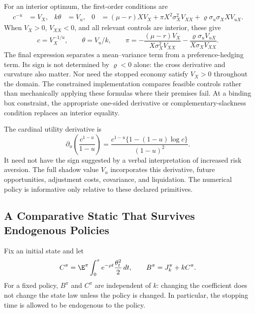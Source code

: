 For an interior optimum, the first-order conditions are
\begin{align}
 c^{-u}&=V_X,& k\theta&=V_u,&
 0&=(\mu-r)XV_X+\pi X^2\sigma_X^2V_{XX}
               +\varrho\sigma_u\sigma_X X V_{uX}.
 \label{eq:ndu_FOC}
\end{align}
When $V_X>0$, $V_{XX}<0$, and all relevant controls are interior, these give
\begin{equation}
 c=V_X^{-1/u},\qquad \theta=V_u/k,\qquad
 \pi=-\frac{(\mu-r)V_X}{X\sigma_X^2V_{XX}}
      -\frac{\varrho\sigma_uV_{uX}}{X\sigma_XV_{XX}}.
 \label{eq:ndu_controls}
\end{equation}
The final expression separates a mean--variance term from a preference-hedging term. Its sign is not determined by $\varrho<0$ alone: the cross derivative and curvature also matter. Nor need the stopped economy satisfy $V_X>0$ throughout the domain. The constrained implementation compares feasible controls rather than mechanically applying these formulas where their premises fail. At a binding box constraint, the appropriate one-sided derivative or complementary-slackness condition replaces an interior equality.

The cardinal utility derivative is
\begin{equation}
 \partial_u\left(\frac{c^{1-u}}{1-u}\right)
 =\frac{c^{1-u}\{1-(1-u)\log c\}}{(1-u)^2}.
 \label{eq:normalization_derivative}
\end{equation}
It need not have the sign suggested by a verbal interpretation of increased risk aversion. The full shadow value $V_u$ incorporates this derivative, future opportunities, adjustment costs, covariance, and liquidation. The numerical policy is informative only relative to these declared primitives.

\subsection{A Comparative Static That Survives Endogenous Policies}
Fix an initial state and let
\begin{equation}
 C^\pi=\E^\pi\int_0^\tau e^{-\rho t}\frac{\theta_t^2}{2}\,dt,
 \qquad B^\pi=J_k^\pi+kC^\pi.
 \label{eq:effort_functional}
\end{equation}
For a fixed policy, $B^\pi$ and $C^\pi$ are independent of $k$: changing the coefficient does not change the state law unless the policy is changed. In particular, the stopping time is allowed to be endogenous to the policy.

